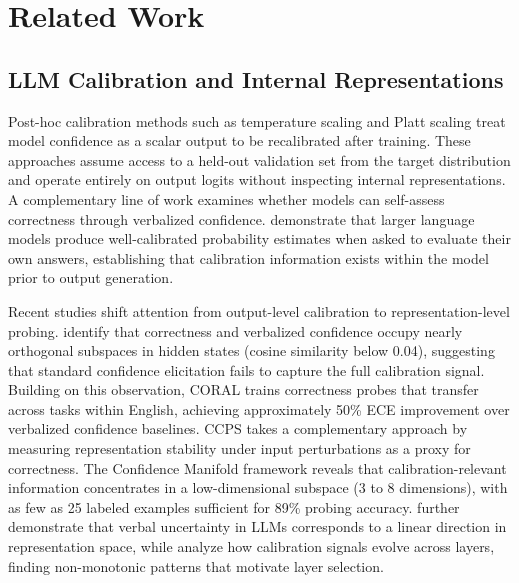 
\section{Related Work}

\subsection{LLM Calibration and Internal Representations}

Post-hoc calibration methods such as temperature scaling \cite{guo2017calibration} and Platt scaling \cite{niculescu2005predicting} treat model confidence as a scalar output to be recalibrated after training. These approaches assume access to a held-out validation set from the target distribution and operate entirely on output logits without inspecting internal representations.
A complementary line of work examines whether models can self-assess correctness through verbalized confidence. \citet{kadavath2022language} demonstrate that larger language models produce well-calibrated probability estimates when asked to evaluate their own answers, establishing that calibration information exists within the model prior to output generation.

Recent studies shift attention from output-level calibration to representation-level probing. \citet{miao2026closing} identify that correctness and verbalized confidence occupy nearly orthogonal subspaces in hidden states (cosine similarity below 0.04), suggesting that standard confidence elicitation fails to capture the full calibration signal. Building on this observation, CORAL \cite{miao2026coral} trains correctness probes that transfer across tasks within English, achieving approximately 50\% ECE improvement over verbalized confidence baselines. CCPS \cite{khanmohammadi2025ccps} takes a complementary approach by measuring representation stability under input perturbations as a proxy for correctness. The Confidence Manifold framework \cite{confidence_manifold2026} reveals that calibration-relevant information concentrates in a low-dimensional subspace (3 to 8 dimensions), with as few as 25 labeled examples sufficient for 89\% probing accuracy. \citet{ji2025calibrating} further demonstrate that verbal uncertainty in LLMs corresponds to a linear direction in representation space, while \citet{joshi2025calibration} analyze how calibration signals evolve across layers, finding non-monotonic patterns that motivate layer selection.

